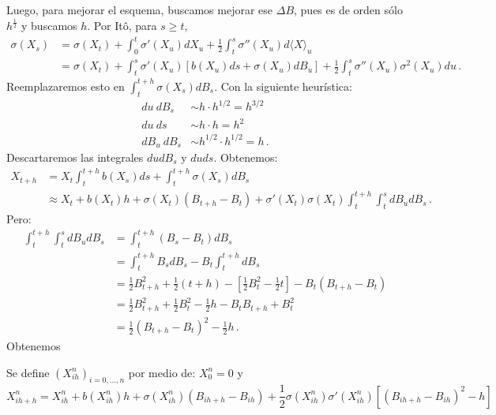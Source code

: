 Luego, para mejorar el esquema, buscamos mejorar ese $\Delta B$, pues es de orden sólo $h^{\frac{1}{2}}$ y 
buscamos $h$. Por It\^{o}, para $s \ge t$, 
\begin{align*}
        \sigma(X_s) & = \sigma(X_t) + \int_{0}^{t} \sigma'(X_u) dX_u + \frac{1}{2} \int_{t}^{s} \sigma''(X_u) d \langle X \rangle_u \\
        &= \sigma(X_t) + \int_{t}^{s} \sigma'(X_u)[b(X_u)ds + \sigma(X_u) dB_u ] + \frac{1}{2} \int_{t}^{s} \sigma''(X_u) \sigma^2(X_u) du \,.
\end{align*}
Reemplazaremos esto en $\int_{t}^{t+h} \sigma (X_s) dB_s$. Con la siguiente heurística:
\begin{align*}
        du~ dB_s   &\sim h \cdot h^{1/2} = h^{3/2} \\ 
        du~ ds     &\sim h \cdot h = h^2 \\
        dB_u~ dB_s &\sim  h^{1/2} \cdot h^{1/2} = h\,.
\end{align*}
Descartaremos las integrales $du dB_s$ y $du ds$. Obtenemos:
\begin{align*}
        X_{t+h} & = X_t \int_{t}^{t+h}b(X_s) ds + \int_{t}^{t+h} \sigma(X_s) dB_s \\
         &  \approx X_t + b(X_t)h + \sigma (X_t)(B_{t+h} - B_t) + \sigma'(X_t) \sigma(X_t) \int_{t}^{t+h}\int_{t}^{s} dB_u dB_s \,.
\end{align*}
Pero: 
\begin{align*}
     \int_{t}^{t+h}\int_{t}^{s} dB_u dB_s 
     &= \int_{t}^{t+h} (B_s -B_t) dB_s \\ 
     &= \int_{t}^{t+h} B_s dB_s - B_t \int_{t}^{t+h} dB_s \\ 
     &= \frac{1}{2} B^2_{t+h} + \frac{1}{2}(t+h) 
        - \left[ \frac{1}{2} B^{2}_t - \frac{1}{2} t \right] - B_t (B_{t+h} - B_t) \\ 
     &= \frac{1}{2} B^{2}_{t+h} + \frac{1}{2} B^{2}_t - \frac{1}{2}h - B_t B_{t+h} + B_{t}^2 \\ 
     &= \frac{1}{2} (B_{t+h} - B_t)^2 - \frac{1}{2} h \,.
\end{align*}
Obtenemos
\begin{algorithm}
\begin{leftbar}
Se define $(X_{ih}^{n})_{i=0,\ldots,n}$ por
medio de: $X_0^n = 0$ y
$$ X_{ih+h}^{n} = X_{ih}^{n} + b(X_{ih}^{n}) h + \sigma(X_{ih}^{n}) (B_{ih +h} - B_{ih}) + \frac{1}{2} \sigma (X_{ih}^{n}) \sigma'(X_{ih}^{n}) \left[ (B_{ih +h} - B_{ih})^2 - h\right] $$
\end{leftbar}
\end{algorithm}

